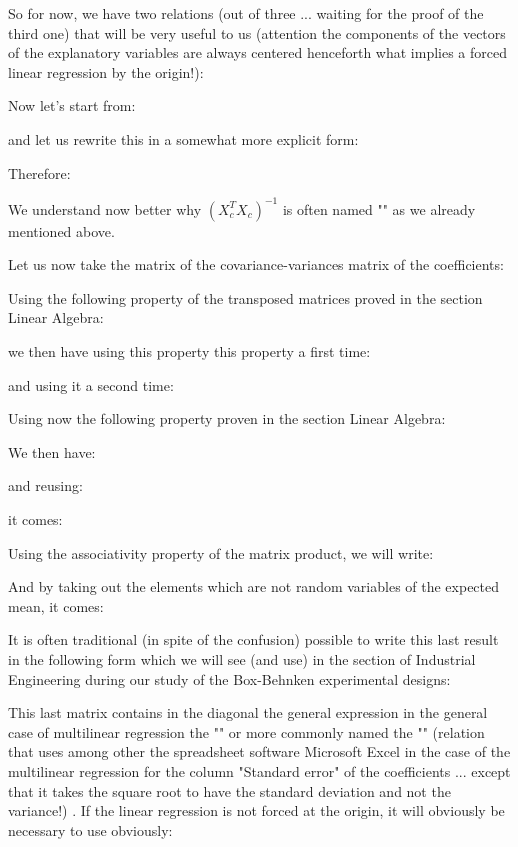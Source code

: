 	So for now, we have two relations (out of three ... waiting for the proof of the third one) that will be very useful to us (attention the components of the vectors of the explanatory variables are always centered henceforth what implies a forced linear regression by the origin!):
	
	Now let's start from:
	
 	and let us rewrite this in a somewhat more explicit form:
	
	Therefore:
	
	We understand now better why $(X_c^TX_c)^{-1}$ is often named "" as we already mentioned above.

	Let us now take the matrix of the covariance-variances matrix of the coefficients:
	
 	Using the following property of the transposed matrices proved in the section Linear Algebra:
	
	we then have using this property this property a first time:
	
	and using it a second time:
	
	Using now the following property proven in the section Linear Algebra:
	
	We then have:
	
	and reusing:
	
	it comes:
	
	Using the associativity property of the matrix product, we will write:
	
	And by taking out the elements which are not random variables of the expected mean, it comes:
	
	It is often traditional (in spite of the confusion) possible to write this last result in the following form which we will see (and use) in the section of Industrial Engineering during our study of the Box-Behnken experimental designs:
	
	This last matrix contains in the diagonal the general expression in the general case of multilinear regression the "" or more commonly named the "" (relation that uses among other the spreadsheet software Microsoft Excel in the case of the multilinear regression for the column "Standard error" of the coefficients ... except that it takes the square root to have the standard deviation and not the variance!) . If the linear regression is not forced at the origin, it will obviously be necessary to use obviously:
	
